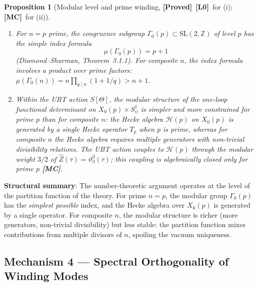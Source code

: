 \documentclass[12pt,a4paper]{article}
\newtheorem{proposition}[theorem]{Proposition}
\theoremstyle{definition}
\theoremstyle{remark}
\newcommand{\ZZ}{\mathbb{Z}}
\newcommand{\PROVED}{\textbf{[Proved]}}
\newcommand{\MC}{\textbf{[MC]}}
\newcommand{\Lzero}{\textbf{[L0]}}
\begin{document}
\begin{proposition}[Modular level and prime winding, \PROVED\ \Lzero\ for (i);
\MC\ for (ii)]
\label{prop:psp:modular}
\begin{enumerate}
  \item[(i)] For $n = p$ prime, the congruence subgroup $\Gamma_0(p) \subset \mathrm{SL}(2,\ZZ)$
             of level $p$ has the simple index formula
             \[
               \mu(\Gamma_0(p)) = p + 1
             \]
             (Diamond--Shurman, Theorem~3.1.1).
             For composite $n$, the index formula involves a product over prime factors:
             $\mu(\Gamma_0(n)) = n\prod_{q \mid n}(1 + 1/q) > n + 1$.

  \item[(ii)] Within the UBT action $S[\Theta]$, the modular structure of the
              one-loop functional determinant on $X_0(p) \times S^1_\psi$ is
              simpler and more constrained for prime $p$ than for composite $n$:
              the Hecke algebra $\mathcal{H}(p)$ on $X_0(p)$ is generated by a
              single Hecke operator $T_p$ when $p$ is prime, whereas for composite $n$
              the Hecke algebra requires multiple generators with non-trivial
              divisibility relations.
              The UBT action couples to $\mathcal{H}(p)$ through the modular weight
              $3/2$ of $\hat{Z}(\tau) = \vartheta_3^3(\tau)$; this coupling is
              \emph{algebraically closed} only for prime $p$ \textbf{[MC]}.
\end{enumerate}
\end{proposition}

\begin{infobox}
\textbf{Structural summary}: The number-theoretic argument operates at the level of
the partition function of the theory.  For prime $n = p$, the modular group
$\Gamma_0(p)$ has the \emph{simplest possible} index, and the Hecke algebra over
$X_0(p)$ is generated by a single operator.  For composite $n$, the modular
structure is richer (more generators, non-trivial divisibility) but less stable:
the partition function mixes contributions from multiple divisors of $n$, spoiling
the vacuum uniqueness.
\end{infobox}

\subsection{Mechanism 4 — Spectral Orthogonality of Winding Modes}
\label{sec:psp:orthogonality}
\end{document}
